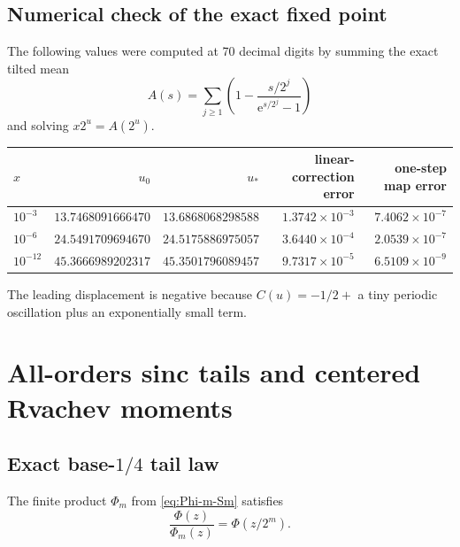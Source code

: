 \documentclass[11pt,oneside]{article}
\theoremstyle{definition}
\theoremstyle{remark}
\newcommand{\e}{\mathrm e}
\begin{document}
\subsection{Numerical check of the exact fixed point}
The following values were computed at 70 decimal digits by summing the exact tilted mean
\[
 A(s)=\sum_{j\ge1}\left(1-\frac{s/2^j}{\e^{s/2^j}-1}\right)
\]
and solving $x2^u=A(2^u)$.
\begin{center}
\small
\begin{tabular}{@{}lrrrr@{}}
\toprule
$x$ & $u_0$ & $u_*$ & linear-correction error & one-step map error\\
\midrule
$10^{-3}$
& $13.7468091666470$ & $13.6868068298588$
& $1.3742\times10^{-3}$ & $7.4062\times10^{-7}$\\
$10^{-6}$
& $24.5491709694670$ & $24.5175886975057$
& $3.6440\times10^{-4}$ & $2.0539\times10^{-7}$\\
$10^{-12}$
& $45.3666989202317$ & $45.3501796089457$
& $9.7317\times10^{-5}$ & $6.5109\times10^{-9}$\\
\bottomrule
\end{tabular}
\end{center}
The leading displacement is negative because $C(u)=-1/2+$ a tiny periodic oscillation plus
an exponentially small term.

\section{All-orders sinc tails and centered Rvachev moments}
\label{sec:tail-moments}

\subsection{Exact base-$1/4$ tail law}
The finite product $\Phi_m$ from \eqref{eq:Phi-m-Sm} satisfies
\begin{equation}
 \frac{\Phi(z)}{\Phi_m(z)}=\Phi(z/2^m).                    \label{eq:tail-shell}
\end{equation}
\end{document}
